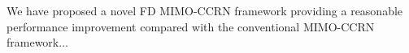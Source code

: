 \documentclass[master,english,final]{kaist-ucs}
\begin{document}
	We have proposed a novel FD MIMO-CCRN framework providing a reasonable performance improvement compared with the conventional MIMO-CCRN framework...
%
%
%
%
%
%
%
%
%
%
%
%
%
%
%
%

\end{document}
